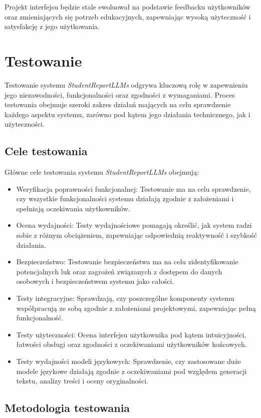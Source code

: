 \documentclass[a4paper, 12pt]{article}
\begin{document}
Projekt interfejsu będzie stale ewoluował na podstawie feedbacku użytkowników oraz zmieniających się potrzeb edukacyjnych, zapewniając wysoką użyteczność i satysfakcję z jego użytkowania.

\section{Testowanie}
Testowanie systemu \textit{StudentReportLLMs} odgrywa kluczową rolę w zapewnieniu jego niezawodności, funkcjonalności oraz zgodności z wymaganiami. Proces testowania obejmuje szeroki zakres działań mających na celu sprawdzenie każdego aspektu systemu, zarówno pod kątem jego działania technicznego, jak i użyteczności.

\subsection{Cele testowania}

Główne cele testowania systemu \textit{StudentReportLLMs} obejmują:

\begin{itemize}
\item Weryfikacja poprawności funkcjonalnej: Testowanie ma na celu sprawdzenie, czy wszystkie funkcjonalności systemu działają zgodnie z założeniami i spełniają oczekiwania użytkowników.
\item Ocena wydajności: Testy wydajnościowe pomagają określić, jak system radzi sobie z różnym obciążeniem, zapewniając odpowiednią reaktywność i szybkość działania.
\item Bezpieczeństwo: Testowanie bezpieczeństwa ma na celu zidentyfikowanie potencjalnych luk oraz zagrożeń związanych z dostępem do danych osobowych i bezpieczeństwem systemu jako całości.
\item Testy integracyjne: Sprawdzają, czy poszczególne komponenty systemu współpracują ze sobą zgodnie z założeniami projektowymi, zapewniając pełną funkcjonalność.
\item Testy użyteczności: Ocena interfejsu użytkownika pod kątem intuicyjności, łatwości obsługi oraz zgodności z oczekiwaniami użytkowników końcowych.
\item Testy wydajności modeli językowych: Sprawdzenie, czy zastosowane duże modele językowe działają zgodnie z oczekiwaniami pod względem generacji tekstu, analizy treści i oceny oryginalności.
\end{itemize}

\subsection{Metodologia testowania}
\end{document}
